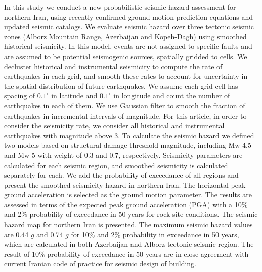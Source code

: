 In this study we conduct a new probabilistic seismic hazard assessment for northern Iran, using recently confirmed ground motion prediction equations and updated seismic catalogs. We evaluate seismic hazard over three tectonic seismic zones (Alborz Mountain Range, Azerbaijan and Kopeh-Dagh) using smoothed historical seismicity. In this model, events are not assigned to specific faults and are assumed to be potential seismogenic sources, spatially gridded to cells. We decluster historical and instrumental seismicity to compute the rate of earthquakes in each grid, and smooth these rates to account for uncertainty in the spatial distribution of future earthquakes. We assume each grid cell has spacing of $0.1^{\circ}$ in latitude and $0.1^{\circ}$ in longitude and count the number of earthquakes in each of them. We use Gaussian filter to smooth the fraction of earthquakes in incremental intervals of magnitude. For this article, in order to consider the seismicity rate, we consider all historical and instrumental earthquakes with magnitude above 3. To calculate the seismic hazard we defined two models based on structural damage threshold magnitude, including Mw 4.5 and Mw 5 with weight of 0.3 and 0.7, respectively. Seismicity parameters are calculated for each seismic region, and smoothed seismicity is calculated separately for each.  We add the probability of exceedance of all regions and present the smoothed seismicity hazard in northern Iran. The horizontal peak ground acceleration is selected as the ground motion parameter. The results are assessed in terms of the expected peak ground acceleration (PGA) with a 10\% and 2\% probability of exceedance in 50 years for rock site conditions. The seismic hazard map for northern Iran is presented. The maximum seismic hazard values are 0.44 $g$ and  0.74 $g$ for 10\% and 2\% probability in exceedance in 50 years, which are calculated in both Azerbaijan and Alborz tectonic seismic region. The result of 10\% probability of exceedance in 50 years are in close agreement with current Iranian code of practice for seismic design of building.
